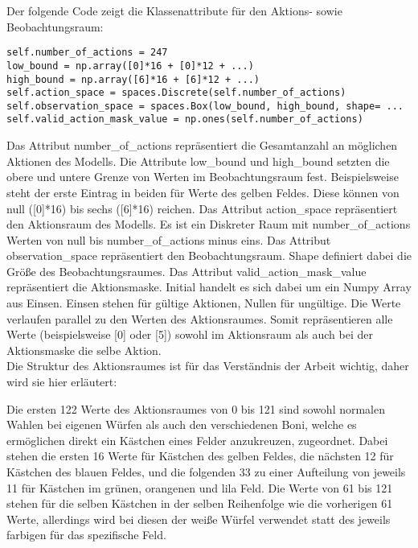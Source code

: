 \begin{minipage}{\linewidth}
Der folgende Code zeigt die Klassenattribute für den Aktions- sowie Beobachtungsraum:
\vspace{0.5cm}
\begin{lstlisting}[caption={Klassenattribute Aktionsraum und Beobachtungsraum}]
self.number_of_actions = 247
low_bound = np.array([0]*16 + [0]*12 + ...)
high_bound = np.array([6]*16 + [6]*12 + ...)
self.action_space = spaces.Discrete(self.number_of_actions)
self.observation_space = spaces.Box(low_bound, high_bound, shape= ...
self.valid_action_mask_value = np.ones(self.number_of_actions)
\end{lstlisting}
\end{minipage}

Das Attribut number\_of\_actions repräsentiert die Gesamtanzahl an möglichen Aktionen des Modells. Die Attribute low\_bound und high\_bound setzten die obere und untere Grenze von Werten im Beobachtungsraum fest. Beispielsweise steht der erste Eintrag in beiden für Werte des gelben Feldes. Diese können von null ([0]*16) bis sechs ([6]*16) reichen. Das Attribut action\_space repräsentiert den Aktionsraum des Modells. Es ist ein Diskreter Raum mit number\_of\_actions Werten von null bis number\_of\_actions minus eins. Das Attribut observation\_space repräsentiert den Beobachtungsraum. Shape definiert dabei die Größe des Beobachtungsraumes. Das Attribut valid\_action\_mask\_value repräsentiert die Aktionsmaske. Initial handelt es sich dabei um ein Numpy Array aus Einsen. Einsen stehen für gültige Aktionen, Nullen für ungültige. Die Werte verlaufen parallel zu den Werten des Aktionsraumes. Somit repräsentieren alle Werte (beispielsweise [0] oder [5]) sowohl im Aktionsraum als auch bei der Aktionsmaske die selbe Aktion.\\

Die Struktur des Aktionsraumes ist für das Verständnis der Arbeit wichtig, daher wird sie hier erläutert:

Die ersten 122 Werte des Aktionsraumes von 0 bis 121 sind sowohl normalen Wahlen bei eigenen Würfen als auch den verschiedenen Boni, welche es ermöglichen direkt ein Kästchen eines Felder anzukreuzen, zugeordnet. Dabei stehen die ersten 16 Werte für Kästchen des gelben Feldes, die nächsten 12 für Kästchen des blauen Feldes, und die folgenden 33 zu einer Aufteilung von jeweils 11 für Kästchen im grünen, orangenen und lila Feld. Die Werte von 61 bis 121 stehen für die selben Kästchen in der selben Reihenfolge wie die vorherigen 61 Werte, allerdings wird bei diesen der weiße Würfel verwendet statt des jeweils farbigen für das spezifische Feld.

